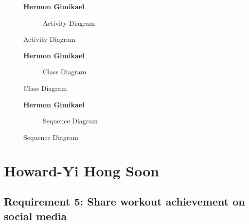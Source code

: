 \documentclass{article}
\begin{document}
\clearpage


\begin{figure}[htbp]
    \textbf{Hermon Gimikael}
    \centering
    \begin{subfigure}{\textwidth}
        \resizebox{\textwidth}{!}{}
        \caption{Activity Diagram}
    \end{subfigure}
\end{figure}

\clearpage

\begin{figure}[htbp]
    \textbf{Hermon Gimikael}
    \centering
    \begin{subfigure}{\textwidth}
        \resizebox{\textwidth}{!}{}
        \caption{Class Diagram}
    \end{subfigure}
\end{figure}

\clearpage

\begin{figure}[htbp]
	\textbf{Hermon Gimikael}
	\centering
	\begin{subfigure}{\textwidth}
		\resizebox{\textwidth}{!}{}
		\caption{Sequence Diagram}
	\end{subfigure}
\end{figure}


\clearpage


\section{Howard-Yi Hong Soon}
		\subsection{Requirement 5: Share workout achievement on social media}
		
\end{document}
